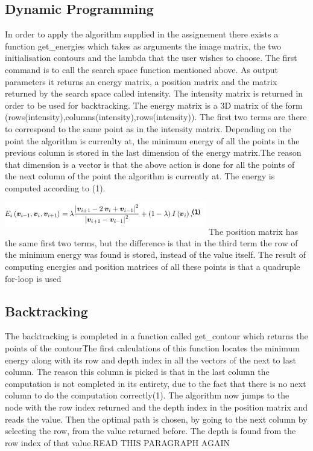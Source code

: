 \documentclass[12pt,a4paper,twocolumn]{article}
\begin{document}
\subsection{Dynamic Programming}
In order to apply the algorithm supplied in the assignement there exists a function get\_energies which takes as arguments the image matrix, the two initialisation contours and the lambda that the user wishes to choose. The first command is to call the search space function mentioned above. As output parameters it returns an energy matrix, a position matrix and the matrix returned by the search space called intensity. The intensity matrix is returned in order to be used for backtracking. The energy matrix is a 3D matrix of the form (rows(intensity),columns(intensity),rows(intensity)).
The first two terms are there to correspond to the same point as in the intensity matrix. Depending on the point the algorithm is currenlty at, the minimum energy of all the points in the previous column is stored in the last dimension of the energy matrix.The reason that dimension is a vector is that the above action is done for all the points of the next column of the point the algorithm is currently at. The energy is computed according to (1). 
\includegraphics[width=250pt,height=50pt,scale=1]{energy_eq.jpg}
The position matrix has the same first two terms, but the difference is that in the third term the row of the minimum energy was found is stored, instead of the value itself. The result of computing energies and position matrices of all these points is that a quadruple for-loop is used
\subsection{Backtracking}
The backtracking is completed in a function called get\_contour which returns the points of the contour\. The first calculations of this function locates the minimum energy along with its row and depth index in all the vectors of the next to last column. The reason this column is picked is that in the last column the computation is not completed in its entirety, due to the fact that there is no next column to do the computation correctly(1). The algorithm now jumps to the node with the row index returned and the depth index in the position matrix and reads the value. Then the optimal path is chosen, by going to the next column by selecting the row, from the value returned before. The depth is found from the row index of that value.READ THIS PARAGRAPH AGAIN
\end{document}
